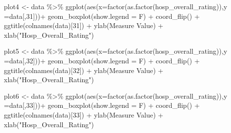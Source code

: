 \documentclass[
]{article}
\newenvironment{Shaded}{\begin{snugshade}}{\end{snugshade}}
\newcommand{\AttributeTok}[1]{\textcolor[rgb]{0.77,0.63,0.00}{#1}}
\newcommand{\DecValTok}[1]{\textcolor[rgb]{0.00,0.00,0.81}{#1}}
\newcommand{\FunctionTok}[1]{\textcolor[rgb]{0.00,0.00,0.00}{#1}}
\newcommand{\NormalTok}[1]{#1}
\newcommand{\OtherTok}[1]{\textcolor[rgb]{0.56,0.35,0.01}{#1}}
\newcommand{\SpecialCharTok}[1]{\textcolor[rgb]{0.00,0.00,0.00}{#1}}
\newcommand{\StringTok}[1]{\textcolor[rgb]{0.31,0.60,0.02}{#1}}
\begin{document}
\begin{Shaded}
\begin{Highlighting}[]
\NormalTok{plot4 }\OtherTok{\textless{}{-}}\NormalTok{ data }\SpecialCharTok{\%\textgreater{}\%} \FunctionTok{ggplot}\NormalTok{(}\FunctionTok{aes}\NormalTok{(}\AttributeTok{x=}\FunctionTok{factor}\NormalTok{(}\FunctionTok{as.factor}\NormalTok{(hosp\_overall\_rating)),}\AttributeTok{y =}\NormalTok{data[,}\DecValTok{31}\NormalTok{]))}\SpecialCharTok{+}
  \FunctionTok{geom\_boxplot}\NormalTok{(}\AttributeTok{show.legend =}\NormalTok{ F) }\SpecialCharTok{+}
  \FunctionTok{coord\_flip}\NormalTok{() }\SpecialCharTok{+}
  \FunctionTok{ggtitle}\NormalTok{(}\FunctionTok{colnames}\NormalTok{(data)[}\DecValTok{31}\NormalTok{]) }\SpecialCharTok{+} 
  \FunctionTok{ylab}\NormalTok{(}\StringTok{\textquotesingle{}Measure Value\textquotesingle{}}\NormalTok{) }\SpecialCharTok{+} \FunctionTok{xlab}\NormalTok{(}\StringTok{"Hosp\_Overall\_Rating"}\NormalTok{)}

\NormalTok{plot5 }\OtherTok{\textless{}{-}}\NormalTok{ data }\SpecialCharTok{\%\textgreater{}\%} \FunctionTok{ggplot}\NormalTok{(}\FunctionTok{aes}\NormalTok{(}\AttributeTok{x=}\FunctionTok{factor}\NormalTok{(}\FunctionTok{as.factor}\NormalTok{(hosp\_overall\_rating)),}\AttributeTok{y =}\NormalTok{data[,}\DecValTok{32}\NormalTok{]))}\SpecialCharTok{+}
  \FunctionTok{geom\_boxplot}\NormalTok{(}\AttributeTok{show.legend =}\NormalTok{ F) }\SpecialCharTok{+}
  \FunctionTok{coord\_flip}\NormalTok{() }\SpecialCharTok{+}
  \FunctionTok{ggtitle}\NormalTok{(}\FunctionTok{colnames}\NormalTok{(data)[}\DecValTok{32}\NormalTok{]) }\SpecialCharTok{+} 
  \FunctionTok{ylab}\NormalTok{(}\StringTok{\textquotesingle{}Measure Value\textquotesingle{}}\NormalTok{) }\SpecialCharTok{+} \FunctionTok{xlab}\NormalTok{(}\StringTok{"Hosp\_Overall\_Rating"}\NormalTok{)}

\NormalTok{plot6 }\OtherTok{\textless{}{-}}\NormalTok{ data }\SpecialCharTok{\%\textgreater{}\%} \FunctionTok{ggplot}\NormalTok{(}\FunctionTok{aes}\NormalTok{(}\AttributeTok{x=}\FunctionTok{factor}\NormalTok{(}\FunctionTok{as.factor}\NormalTok{(hosp\_overall\_rating)),}\AttributeTok{y =}\NormalTok{data[,}\DecValTok{33}\NormalTok{]))}\SpecialCharTok{+}
  \FunctionTok{geom\_boxplot}\NormalTok{(}\AttributeTok{show.legend =}\NormalTok{ F) }\SpecialCharTok{+}
  \FunctionTok{coord\_flip}\NormalTok{() }\SpecialCharTok{+}
  \FunctionTok{ggtitle}\NormalTok{(}\FunctionTok{colnames}\NormalTok{(data)[}\DecValTok{33}\NormalTok{]) }\SpecialCharTok{+} 
  \FunctionTok{ylab}\NormalTok{(}\StringTok{\textquotesingle{}Measure Value\textquotesingle{}}\NormalTok{) }\SpecialCharTok{+} \FunctionTok{xlab}\NormalTok{(}\StringTok{"Hosp\_Overall\_Rating"}\NormalTok{)}


\end{Highlighting}
\end{Shaded}
\end{document}

